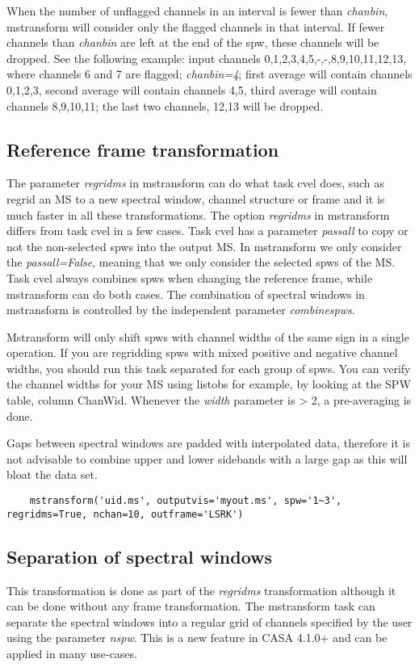 When the number of unflagged channels in an interval is fewer than {\it chanbin}, mstransform will consider only the flagged channels
in that interval. If fewer  channels than {\it chanbin} are left at the end of the spw, these channels will be dropped.
See the following example: input channels 0,1,2,3,4,5,-,-,8,9,10,11,12,13, where channels 6 and 7 are flagged;
{\it chanbin=4}; first average will contain channels 0,1,2,3, second average will contain channels 4,5, third average will
contain channels 8,9,10,11; the last two channels, 12,13 will be dropped.


\subsection{Reference frame transformation}
The parameter {\it regridms} in mstransform can do what task cvel does, such as
regrid an MS to a new spectral window, channel structure or frame and it is
much faster in all these transformations. The option {\it regridms} in
mstransform differs from task cvel in a few cases. Task cvel has a parameter {\it passall} 
to copy or not the non-selected spws into the output MS. In mstransform we only consider 
the {\it passall=False}, meaning that we only consider the
selected spws of the MS. Task cvel always combines spws when changing the reference
frame, while mstransform can do both cases. The combination of spectral windows in mstransform
is controlled by the independent parameter {\it combinespws}.

Mstransform will only shift spws with channel widths of the same sign in a
single operation. If you are regridding spws with mixed positive and negative channel widths, 
you should run this task separated for each group of spws. You can verify the channel widths 
for your MS using listobs for example, by looking at the SPW table, column
ChanWid. Whenever the {\it width} parameter is > 2, a pre-averaging is done. 

Gaps between spectral windows are padded with interpolated data, therefore it is
not advisable to combine upper and lower sidebands with a large gap as this will
bloat the data set. 

\begin{verbatim}
    mstransform('uid.ms', outputvis='myout.ms', spw='1~3', regridms=True, nchan=10, outframe='LSRK')
\end{verbatim}

\subsection{Separation of spectral windows}
This transformation is done as part of the {\it regridms} transformation
although it can be done without any frame transformation. The mstransform
task can separate the spectral windows into a regular grid of channels specified
by the user using the parameter {\it nspw}. This is a new feature in CASA
4.1.0+ and can be applied in many use-cases. %

